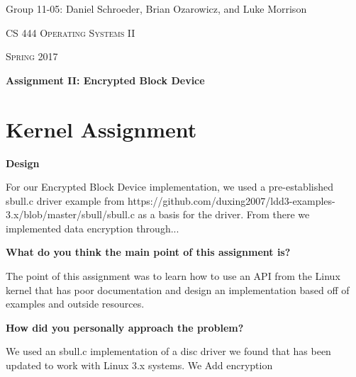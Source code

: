 \documentclass[10pt,letterpaper,draftclsnofoot,onecolumn]{IEEEtran}
\begin{document}
\begin{titlepage}
\centering
{\Large Group 11-05: Daniel Schroeder, Brian Ozarowicz, and Luke Morrison\par}
\vspace{1cm}
{\scshape\Large CS 444 Operating Systems II\par}
{\scshape\Large Spring 2017\par}
\vspace{1cm}
{\huge\bfseries Assignment II: Encrypted Block Device\par}
\vspace{2cm}
\begin{abstract}
This document is a summary of Assignment 3 for CS 444 Operating Systems II at Oregon State University Spring 2017. This document includes the design and implementation of the kernel assignment to implement an Encrypted Block Device, responses to the design and implimenation questions for the kernel and concurrency assignments, and a work log.
\end{abstract}
\end{titlepage}

\section{Kernel Assignment}
\bigskip

\noindent\textbf{Design}
\medskip

\medskip

\noindent For our Encrypted Block Device implementation, we used a pre-established sbull.c driver example from {https://github.com/duxing2007/ldd3-examples-3.x/blob/master/sbull/sbull.c} as a basis for the driver. From there we implemented data encryption through...

\bigskip

\noindent\textbf{What do you think the main point of this assignment is?}
\medskip

\medskip

\noindent The point of this assignment was to learn how to use an API from the Linux kernel that has poor documentation and design an implementation based off of examples and outside resources.
\bigskip

\noindent\textbf{How did you personally approach the problem?}
\medskip

\medskip

\noindent We used an sbull.c implementation of a disc driver we found that has been updated to work with Linux 3.x systems. We {Add encryption} 
\medskip
\end{document}
